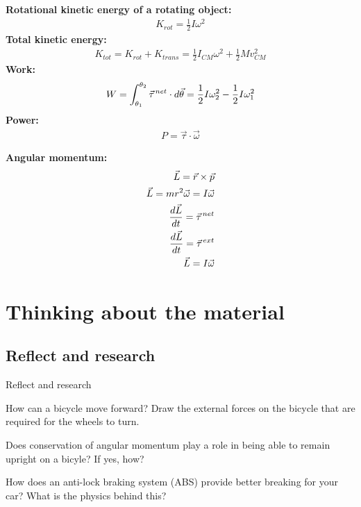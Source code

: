 \newpage
\begin{importantEquations}
\medskip
\begin{multicols}{2}
\textbf{Rotational kinetic energy of a rotating object:}
\begin{align*}
K_{rot} = \frac{1}{2}I\omega^2
\end{align*}
\textbf{Total kinetic energy:}
\begin{align*}
K_{tot} = K_{rot} + K_{trans} = \frac{1}{2}I_{CM}\omega^2+ \frac{1}{2}Mv_{CM}^2
\end{align*}
\textbf{Work:}
\begin{align*}
W = \int_{\theta_1}^{\theta_2}\pvec \tau^{net}\cdot d\vec \theta = \frac{1}{2}I\omega_2^2 -\frac{1}{2}I\omega_1^2
\end{align*}
\textbf{Power:}
\begin{align*}
P = \vec \tau \cdot \vec \omega
\end{align*}
\columnbreak

\textbf{Angular momentum:}
\begin{align*}
\vec L = \vec r \times \vec p\\
\vec L = mr^2\vec\omega = I\vec\omega\\
\frac{d\vec L}{dt}=\pvec\tau^{net}\\
\frac{d\vec L}{dt}=\pvec\tau^{ext}\\
\vec L = I\vec \omega\\
\end{align*}
\medskip
\end{multicols}
\end{importantEquations}

\newpage
\section{Thinking about the material}
\subsection{Reflect and research}

\begin{chapteractivity}{Reflect and research}
{
\item How can a bicycle move forward? Draw the external forces on the bicycle that are required for the wheels to turn.
\item Does conservation of angular momentum play a role in being able to remain upright on a bicyle? If yes, how?
\item How does an anti-lock braking system (ABS) provide better breaking for your car? What is the physics behind this?
}
\end{chapteractivity}

